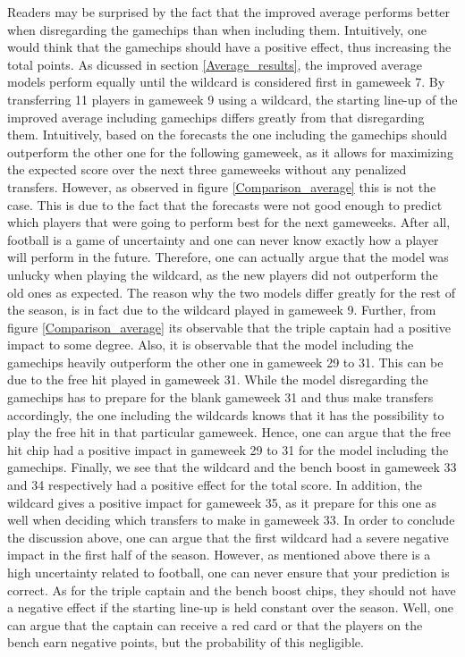 \newpar
Readers may be surprised by the fact that the improved average performs better when disregarding the gamechips than when including them. Intuitively, one would think that the gamechips should have a positive effect, thus increasing the total points. As dicussed in section \ref{Average_results}, the improved average models perform equally until the wildcard is considered first in gameweek 7. By transferring 11 players in gameweek 9 using a wildcard, the starting line-up of the improved average including gamechips differs greatly from that disregarding them. Intuitively, based on the forecasts the one including the gamechips should outperform the other one for the following gameweek, as it allows for maximizing the expected score over the next three gameweeks without any penalized transfers. However, as observed in figure \ref{Comparison_average} this is not the case. This is due to the fact that the forecasts were not good enough to predict which players that were going to perform best for the next gameweeks. After all, football is a game of uncertainty and one can never know exactly how a player will perform in the future. Therefore, one can actually argue that the model was unlucky when playing the wildcard, as the new players did not outperform the old ones as expected. 
\newpar
The reason why the two models differ greatly for the rest of the season, is in fact due to the wildcard played in gameweek 9. Further, from figure \ref{Comparison_average} its observable that the triple captain had a positive impact to some degree. Also, it is observable that the model including the gamechips heavily outperform the other one in gameweek 29 to 31. This can be due to the free hit played in gameweek 31. While the model disregarding the gamechips has to prepare for the blank gameweek 31 and thus make transfers accordingly, the one including the wildcards knows that it has the possibility to play the free hit in that particular gameweek. Hence, one can argue that the free hit chip had a positive impact in gameweek 29 to 31 for the model including the gamechips. 
\newpar
Finally, we see that the wildcard and the bench boost in gameweek 33 and 34 respectively had a positive effect for the total score. In addition, the wildcard gives a positive impact for gameweek 35, as it prepare for this one as well when deciding which transfers to make in gameweek 33. 
\newpar
In order to conclude the discussion above, one can argue that the first wildcard had a severe negative impact in the first half of the season. However, as mentioned above there is a high uncertainty related to football, one can never ensure that your prediction is correct. 
As for the triple captain and the bench boost chips, they should not have a negative effect if the starting line-up is held constant over the season. Well, one can argue that the captain can receive a red card or that the players on the bench earn negative points, but the probability of this negligible. 

